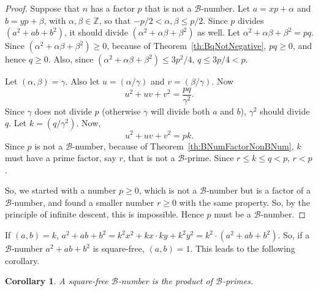\documentclass[reqno]{amsart}
\newtheorem{corollary}{Corollary}[theorem]
\newcommand{\bnum}   {\ensuremath{\mathcal B}-number}
\newcommand{\bprime} {\ensuremath{\mathcal B}-prime}
\newcommand{\bq}[2]{\ensuremath{{#1}^2 + {#1}{#2} + {#2}^2}}
\newcommand{\bqab}{\bq{a}{b}}
\newcommand{\Integer}{\ensuremath{\mathbb{Z}}}
\begin{document}
\begin{proof}
  Suppose that $n$ has a factor $p$ that is not a \bnum.  Let $a =
  xp + \alpha$ and $b = yp + \beta$, with $\alpha,\beta\in\Integer$,
  so that $-p/2 < \alpha, \beta \le p/2$.  Since $p$ divides
  $(\bqab)$, it should divide
  $(\bq{\alpha}{\beta})$ as well.  Let $\bq{\alpha}{\beta} = pq$.
  Since $(\bq{\alpha}{\beta}) \ge 0$, because of Theorem~\ref{th:BqNotNegative},
  $pq \ge 0$, and hence $q \ge 0$.  Also, since
  $(\bq{\alpha}{\beta}) \le 3p^2/4$, $q \le 3p/4 < p$.

  Let $(\alpha, \beta) = \gamma$.  Also let $u =
  (\alpha/\gamma)$ and $v = (\beta/\gamma)$.  Now 
  \begin{equation*}
    \bq{u}{v} = \frac{pq}{\gamma^2}. 
  \end{equation*}
  Since $\gamma$ does not divide $p$ (otherwise $\gamma$
  will divide both $a$
  and $b$), $\gamma^2$ should divide $q$.  Let $k=
  (q/\gamma^2)$.  Now,
  \begin{equation*}
    \bq{u}{v} = pk.
  \end{equation*}
  Since $p$ is not a \bnum, because of
  Theorem~\ref{th:BNumFactorNonBNum}, $k$ must have a prime
  factor, say $r$, 
  that is not a \bprime.  Since $r \le k \le q < p$, $r <
  p$. 

  So, we started with a number $p \ge 0$, which is not a
  \bnum{} but is a factor of a \bnum{}, and found a
  smaller number $r \ge 0$ with the same property.  So, by the
  principle of infinite descent, this is impossible.
  Hence $p$ must be a \bnum.
\end{proof}

If $(a,b) = k$, $\bqab = k^2x^2 + kx \cdot ky + k^2y^2 = k^2
\cdot (\bqab)$.  So, if a \bnum{} \bqab{} is square-free,
$(a,b) = 1$.  This leads to the following corollary.

\begin{corollary}
  A square-free \bnum{} is the product of \bprime{}s.
  \label{th:SquareFreeBNumIsBPrimeProduct}
\end{corollary}
\end{document}
